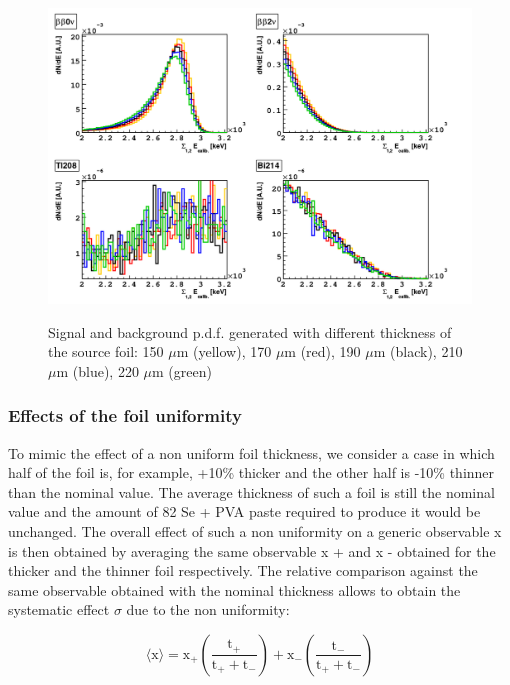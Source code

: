 \documentclass[main.tex]{subfiles}
\begin{document}
\begin{figure}[h!]
\centering
\includegraphics[scale=0.35]{pictures/Chap4/PVAspectra.png}
\label{PVAspectra.png}
\caption{Signal and background p.d.f. generated with different thickness of the source foil: 150 $\mu$m (yellow), 170 $\mu$m (red), 190 $\mu$m (black), 210 $\mu$m (blue), 220 $\mu$m (green)}
\end{figure}


\subsubsection{Effects of the foil uniformity}


\NI To mimic the effect of a non uniform foil thickness, we consider a case in which half of the foil is, for example, +10\% thicker and the other half is -10\% thinner than the nominal value. The average thickness of such a foil is still the nominal value and the amount of 82 Se + PVA paste required to produce it would be unchanged. The overall effect of such a non uniformity on a generic observable x is then obtained by averaging the same observable x + and x - obtained for the thicker and the thinner foil respectively. The relative comparison against the same observable obtained with the nominal thickness allows to obtain the systematic effect $\sigma$ due to the non uniformity:


\begin{equation}
\langle \text{x} \rangle = \text{x}_+ \left( \frac{\text{t}_+}{\text{t}_+ + \text{t}_-}  \right) + \text{x}_- \left( \frac{\text{t}_-}{\text{t}_+ + \text{t}_-}  \right) 
\end{equation}
\end{document}
